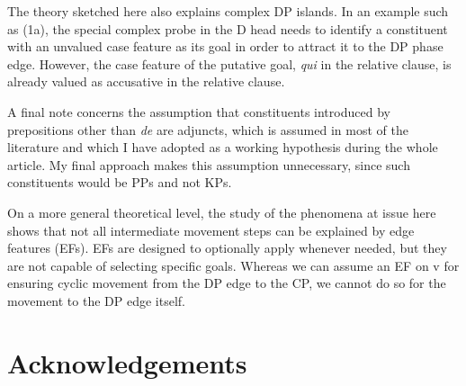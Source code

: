 \documentclass[output=paper]{langsci/langscibook}
\begin{document}
The theory sketched here also explains complex DP islands. In an example such as (1a), the special complex probe in the D head needs to identify a constituent with an unvalued case feature as its goal in order to attract it to the DP phase edge. However, the case feature of the putative goal, \textit{qui} in the relative clause, is already valued as accusative in the relative clause.

A final note concerns the assumption that constituents introduced by prepositions other than \textit{de} are adjuncts, which is assumed in most of the literature and which I have adopted as a working hypothesis during the whole article. My final approach makes this assumption unnecessary, since such constituents would be PPs and not KPs.

On a more general theoretical level, the study of the phenomena at issue here shows that not all intermediate movement steps can be explained by  edge features (EFs). EFs are designed to optionally apply whenever needed, but they are not capable of selecting specific goals. Whereas we can assume an EF on v for ensuring cyclic movement from the DP edge to the CP, we cannot do so for the movement to the DP edge itself.

\section*{Acknowledgements}
\end{document}
